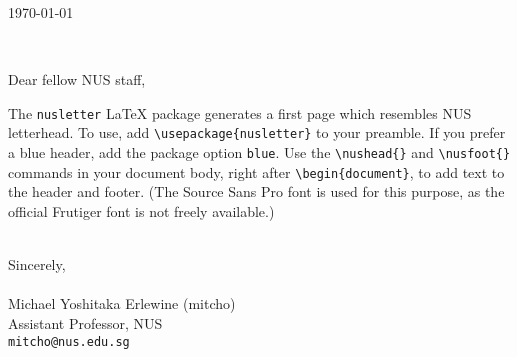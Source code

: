 \documentclass[a4paper]{article}
\begin{document}


\pagestyle{empty}

\noindent\today

\

\noindent Dear fellow NUS staff,

The \verb`nusletter` \LaTeX{} package generates a first page which resembles NUS letterhead. To use, add \verb`\usepackage{nusletter}` to your preamble. If you prefer a blue header, add the package option \verb`blue`. Use the \verb`\nushead{}` and \verb`\nusfoot{}` commands in your document body, right after \verb`\begin{document}`, to add text to the header and footer. (The Source Sans Pro font is used for this purpose, as the official Frutiger font is not freely available.)

\lipsum

\lipsum

\lipsum

\hspace*{3.5in}\begin{minipage}{3in}
\-\\Sincerely,\\
\\
Michael Yoshitaka Erlewine (mitcho)\\
Assistant Professor, NUS\\
\texttt{mitcho@nus.edu.sg}
\end{minipage}
\end{document}
